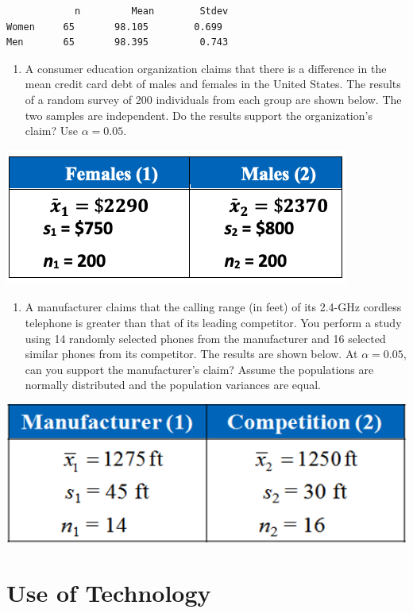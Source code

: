 \documentclass[
]{book}
\providecommand{\tightlist}{%
  \setlength{\itemsep}{0pt}\setlength{\parskip}{0pt}}
\begin{document}
\begin{verbatim}
            n         Mean        Stdev
Women     65       98.105        0.699
Men       65       98.395         0.743
\end{verbatim}

\hfill\break

\begin{enumerate}
\def\labelenumi{\arabic{enumi}.}
\setcounter{enumi}{1}
\tightlist
\item
  A consumer education organization claims that there is a difference in the mean credit card debt of males and females in the United States. The results of a random survey of 200 individuals from each group are shown below. The two samples are independent. Do the results support the organization's claim? Use \(\alpha = 0.05\).
\end{enumerate}

\includegraphics[width=0.3\linewidth]{week11/ex02}

\hfill\break

\begin{enumerate}
\def\labelenumi{\arabic{enumi}.}
\setcounter{enumi}{2}
\tightlist
\item
  A manufacturer claims that the calling range (in feet) of its 2.4-GHz cordless telephone is greater than that of its leading competitor. You perform a study using 14 randomly selected phones from the manufacturer and 16 selected similar phones from its competitor. The results are shown below. At \(\alpha = 0.05\), can you support the manufacturer's claim? Assume the populations are normally distributed and the population variances are equal.
\end{enumerate}

\includegraphics[width=0.3\linewidth]{week11/ex03}

\hfill\break

\hypertarget{use-of-technology-9}{%
\section{Use of Technology}\label{use-of-technology-9}}
\end{document}

